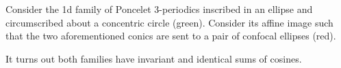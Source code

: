 Consider the 1d family of Poncelet 3-periodics inscribed in an ellipse and circumscribed about a concentric circle (green). Consider its affine image such that the two aforementioned conics are sent to a pair of confocal ellipses (red).

It turns out both families have invariant and identical sums of cosines.